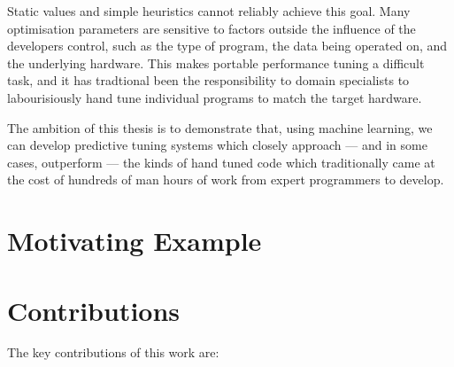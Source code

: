 Static values and simple heuristics cannot reliably achieve this
goal. Many optimisation parameters are sensitive to factors outside
the influence of the developers control, such as the type of program,
the data being operated on, and the underlying hardware. This makes
portable performance tuning a difficult task, and it has tradtional
been the responsibility to domain specialists to labourisiously hand
tune individual programs to match the target hardware.

The ambition of this thesis is to demonstrate that, using machine
learning, we can develop predictive tuning systems which closely
approach --- and in some cases, outperform --- the kinds of hand tuned
code which traditionally came at the cost of hundreds of man hours of
work from expert programmers to develop.


\section{Motivating Example}



\section{Contributions}

The key contributions of this work are:

